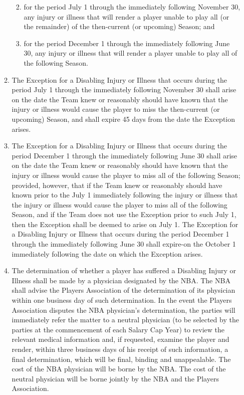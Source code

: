 \documentclass[
]{book}
\providecommand{\tightlist}{%
  \setlength{\itemsep}{0pt}\setlength{\parskip}{0pt}}
\begin{document}
\begin{enumerate}
\begin{enumerate}
    \begin{enumerate}
    \def\labelenumiii{(\roman{enumiii})}
    \tightlist
    \item
      for the period July 1 through the immediately following November 30, any injury or illness that will render a player unable to play all (or the remainder) of the then-current (or upcoming) Season; and
    \item
      for the period December 1 through the immediately following June 30, any injury or illness that will render a player unable to play all of the following Season.
    \end{enumerate}
  \item
    The Exception for a Disabling Injury or Illness that occurs during the period July 1 through the immediately following November 30 shall arise on the date the Team knew or reasonably should have known that the injury or illness would cause the player to miss the then-current (or upcoming) Season, and shall expire 45 days from the date the Exception arises.
  \item
    The Exception for a Disabling Injury or Illness that occurs during the period December 1 through the immediately following June 30 shall arise on the date the Team knew or reasonably should have known that the injury or illness would cause the player to miss all of the following Season; provided, however, that if the Team knew or reasonably should have known prior to the July 1 immediately following the injury or illness that the injury or illness would cause the player to miss all of the following Season, and if the Team does not use the Exception prior to such July 1, then the Exception shall be deemed to arise on July 1. The Exception for a Disabling Injury or Illness that occurs during the period December 1 through the immediately following June 30 shall expire-on the October 1 immediately following the date on which the Exception arises.
  \item
    The determination of whether a player has suffered a Disabling Injury or Illness shall be made by a physician designated by the NBA. The NBA shall advise the Players Association of the determination of its physician within one business day of such determination. In the event the Players Association disputes the NBA physician's determination, the parties will immediately refer the matter to a neutral physician (to be selected by the parties at the commencement of each Salary Cap Year) to review the relevant medical information and, if requested, examine the player and render, within three business days of his receipt of such information, a final determination, which will be final, binding and unappealable. The cost of the NBA physician will be borne by the NBA. The cost of the neutral physician will be borne jointly by the NBA and the Players Association.

\end{enumerate}
\end{enumerate}
\end{document}
